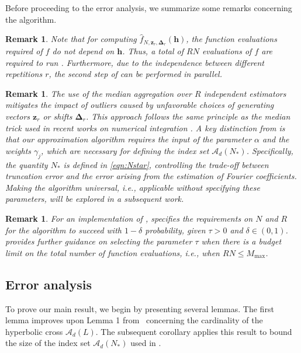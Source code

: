 \documentclass[pdflatex,sn-basic,Numbered]{sn-jnl}%
\newcommand{\bsh}{\boldsymbol{h}}
\newcommand{\bsz}{\boldsymbol{z}}
\newcommand{\bsDelta}{\boldsymbol{\Delta}}
\newcommand{\Acal}{\mathcal{A}}
\theoremstyle{thmstyleone}%
\newtheorem{remark}[theorem]{Remark}
\theoremstyle{thmstyletwo}%
\begin{document}
Before proceeding to the error analysis, we summarize some remarks concerning the algorithm.

\begin{remark}
    Note that for computing $\widehat{f}_{N,\bsz_r,\bsDelta_r}(\bsh)$, the function evaluations required of $f$ do not depend on $\bsh$. Thus, a total of $RN$ evaluations of $f$ are required to run . Furthermore, due to the independence between different repetitions $r$, the second step of  can be performed in parallel.
\end{remark}

\begin{remark}\label{rem:limitation}
    The use of the \emph{median} aggregation over $R$ independent estimators mitigates the impact of outliers caused by unfavorable choices of generating vectors $\bsz_r$ or shifts $\bsDelta_r$. This approach follows the same principle as the median trick used in recent works on numerical integration \cite{goda2022free,goda2024universal,pan2023super-pol,pan2024super-pol}. A key distinction from \cite{goda2022free} is that our approximation algorithm requires the input of the parameter $\alpha$ and the weights $\gamma_j$, which are necessary for defining the index set $\Acal_{d}(N_*)$. Specifically, the quantity $N_*$ is defined in \eqref{eqn:Nstar}, controlling the trade-off between truncation error and the error arising from the estimation of Fourier coefficients. Making the algorithm universal, i.e., applicable without specifying these parameters, will be explored in a subsequent work.
\end{remark}

\begin{remark} 
    For an implementation of ,  specifies the requirements on $N$ and $R$ for the algorithm to succeed with $1-\delta$ probability, given $\tau > 0$ and $\delta \in (0,1)$.  provides further guidance on selecting the parameter $\tau$ when there is a budget limit on the total number of function evaluations, i.e., when $RN \leq M_{\max}$.
\end{remark}




\subsection{Error analysis}
To prove our main result, we begin by presenting several lemmas. The first lemma improves upon Lemma 1 from~\cite{kuo2006lattice} concerning the cardinality of the hyperbolic cross $\Acal_d(L)$. The subsequent corollary applies this result to bound the size of the index set $\Acal_d(N_*)$ used in .
\end{document}
